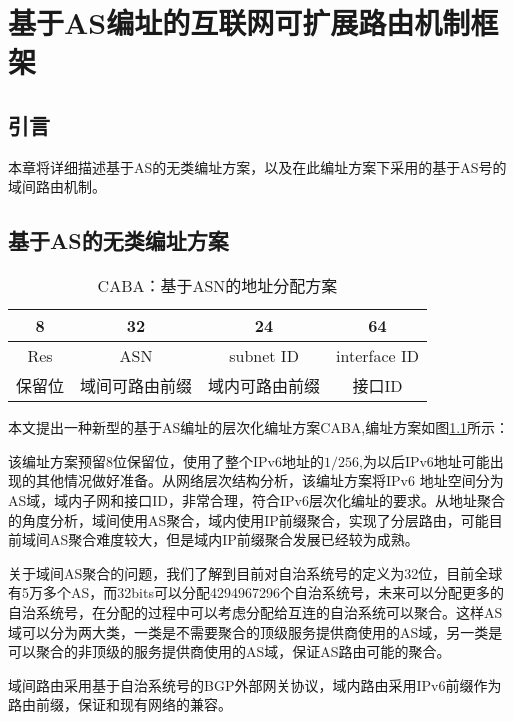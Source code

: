 

\chapter{基于AS编址的互联网可扩展路由机制框架}
\label{cha:model}

\section{引言}
    本章将详细描述基于AS的无类编址方案，以及在此编址方案下采用的基于AS号的域间路由机制。

\section{基于AS的无类编址方案}

\begin{table}[h]
    \centering
    \caption{CABA：基于ASN的地址分配方案}
    \label{tab:caba}
        \begin{tabular}{|c|c|c|c|}
        \hline
        8 & 32 & 24 & 64\\ \hline
        Res & ASN & subnet ID & interface ID\\ \hline
        保留位& 域间可路由前缀 & 域内可路由前缀 & 接口ID\\
        \hline
        \end{tabular}
\end{table}

本文提出一种新型的基于AS编址的层次化编址方案CABA,编址方案如图\ref{tab:caba}所示：

该编址方案预留8位保留位，使用了整个IPv6地址的$1/256$,为以后IPv6地址可能出现的其他情况做好准备。从网络层次结构分析，该编址方案将IPv6 地址空间分为AS域，域内子网和接口ID，非常合理，符合IPv6层次化编址的要求。从地址聚合的角度分析，域间使用AS聚合，域内使用IP前缀聚合，实现了分层路由，可能目前域间AS聚合难度较大，但是域内IP前缀聚合发展已经较为成熟。


关于域间AS聚合的问题，我们了解到目前对自治系统号的定义为32位，目前全球有5万多个AS，而32bits可以分配4294967296个自治系统号，未来可以分配更多的自治系统号，在分配的过程中可以考虑分配给互连的自治系统可以聚合。这样AS域可以分为两大类，一类是不需要聚合的顶级服务提供商使用的AS域，另一类是可以聚合的非顶级的服务提供商使用的AS域，保证AS路由可能的聚合。


域间路由采用基于自治系统号的BGP外部网关协议，域内路由采用IPv6前缀作为路由前缀，保证和现有网络的兼容。

